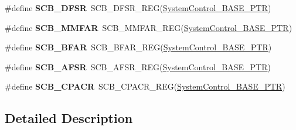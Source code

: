 \begin{DoxyCompactItemize}
\item 
\hypertarget{group___s_c_b___register___accessor___macros_gae3a7746f39eaa9eb3cd867d1dc327c8b}{}\#define {\bfseries S\+C\+B\+\_\+\+D\+F\+S\+R}~S\+C\+B\+\_\+\+D\+F\+S\+R\+\_\+\+R\+E\+G(\hyperlink{group___s_c_b___peripheral_gaf22864785770f832103e904244e078cb}{System\+Control\+\_\+\+B\+A\+S\+E\+\_\+\+P\+T\+R})\label{group___s_c_b___register___accessor___macros_gae3a7746f39eaa9eb3cd867d1dc327c8b}

\item 
\hypertarget{group___s_c_b___register___accessor___macros_ga1fc21962567cb3e1c6ac552ed3068091}{}\#define {\bfseries S\+C\+B\+\_\+\+M\+M\+F\+A\+R}~S\+C\+B\+\_\+\+M\+M\+F\+A\+R\+\_\+\+R\+E\+G(\hyperlink{group___s_c_b___peripheral_gaf22864785770f832103e904244e078cb}{System\+Control\+\_\+\+B\+A\+S\+E\+\_\+\+P\+T\+R})\label{group___s_c_b___register___accessor___macros_ga1fc21962567cb3e1c6ac552ed3068091}

\item 
\hypertarget{group___s_c_b___register___accessor___macros_gaee532e1c3e3c27881a564b9a63f036cd}{}\#define {\bfseries S\+C\+B\+\_\+\+B\+F\+A\+R}~S\+C\+B\+\_\+\+B\+F\+A\+R\+\_\+\+R\+E\+G(\hyperlink{group___s_c_b___peripheral_gaf22864785770f832103e904244e078cb}{System\+Control\+\_\+\+B\+A\+S\+E\+\_\+\+P\+T\+R})\label{group___s_c_b___register___accessor___macros_gaee532e1c3e3c27881a564b9a63f036cd}

\item 
\hypertarget{group___s_c_b___register___accessor___macros_ga16a8b546ae510f0d470908e8ac913d11}{}\#define {\bfseries S\+C\+B\+\_\+\+A\+F\+S\+R}~S\+C\+B\+\_\+\+A\+F\+S\+R\+\_\+\+R\+E\+G(\hyperlink{group___s_c_b___peripheral_gaf22864785770f832103e904244e078cb}{System\+Control\+\_\+\+B\+A\+S\+E\+\_\+\+P\+T\+R})\label{group___s_c_b___register___accessor___macros_ga16a8b546ae510f0d470908e8ac913d11}

\item 
\hypertarget{group___s_c_b___register___accessor___macros_gaa1677b86fc9699414925aeca46baac9a}{}\#define {\bfseries S\+C\+B\+\_\+\+C\+P\+A\+C\+R}~S\+C\+B\+\_\+\+C\+P\+A\+C\+R\+\_\+\+R\+E\+G(\hyperlink{group___s_c_b___peripheral_gaf22864785770f832103e904244e078cb}{System\+Control\+\_\+\+B\+A\+S\+E\+\_\+\+P\+T\+R})\label{group___s_c_b___register___accessor___macros_gaa1677b86fc9699414925aeca46baac9a}

\end{DoxyCompactItemize}


\subsection{Detailed Description}
